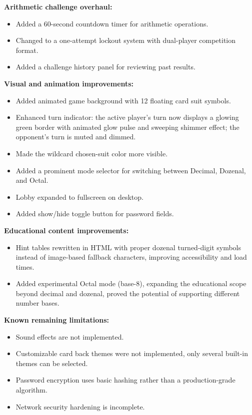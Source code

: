 \documentclass{article}
\begin{document}
\textbf{Arithmetic challenge overhaul:}
\begin{itemize}
  \item Added a 60-second countdown timer for arithmetic operations.
  \item Changed to a one-attempt lockout system with dual-player competition format.
  \item Added a challenge history panel for reviewing past results.
\end{itemize}

\textbf{Visual and animation improvements:}
\begin{itemize}
  \item Added animated game background with 12 floating card suit symbols.
  \item Enhanced turn indicator: the active player's turn now displays a glowing green border with animated glow pulse and sweeping shimmer effect; the opponent's turn is muted and dimmed.
  \item Made the wildcard chosen-suit color more visible.
  \item Added a prominent mode selector for switching between Decimal, Dozenal, and Octal.
  \item Lobby expanded to fullscreen on desktop.
  \item Added show/hide toggle button for password fields.
\end{itemize}

\textbf{Educational content improvements:}
\begin{itemize}
  \item Hint tables rewritten in HTML with proper dozenal turned-digit symbols instead of image-based fallback characters, improving accessibility and load times.
  \item Added experimental Octal mode (base-8), expanding the educational scope beyond decimal and dozenal, proved the potential of supporting different number bases.
\end{itemize}

\textbf{Known remaining limitations:}
\begin{itemize}
  \item Sound effects are not implemented.
  \item Customizable card back themes were not implemented, only several built-in themes can be selected.
  \item Password encryption uses basic hashing rather than a production-grade algorithm.
  \item Network security hardening is incomplete.
\end{itemize}
\end{document}
